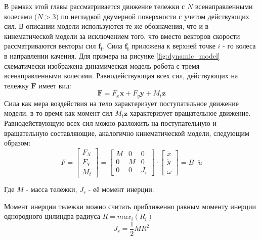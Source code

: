 \documentclass[oneside,final,14pt]{extreport}
\newcommand{\bs}{\boldsymbol}
\begin{document}
В рамках этой главы рассматривается движение тележки с $N$ всенаправленными колесами ($N > 3$) по негладкой двумерной поверхности с учетом действующих сил. В описании модели используются те же обозначения, что и в кинематической модели за исключением того, что вместо векторов скорости рассматриваются векторы сил $\bs{f_{i}}$. Сила $\bs{f_{i}}$ приложена к верхней точке $i$ - го колеса в направлении качения. Для примера на рисунке \ref{fig:dynamic_model} схематически изображена динамическая модель робота с тремя всенаправленными колесами. Равнодействующая всех сил, действующих на тележку $\bs{F}$ имеет вид:
\begin{equation}
\bs{F}
=
F_{x}\bs{x}
+
F_{y}\bs{y}
+
M_{t}\bs{z}
\end{equation} 
Сила как мера воздействия на тело характеризует поступательное движение модели, в то время как момент сил $M_{t}\bs{z}$ характеризует вращательное движение. Равнодействующую всех сил можно разложить на поступательную и вращательную составляющие, аналогично кинематической модели, следующим образом:
\begin{equation}
F
=
\begin{bmatrix}
F_{X} \\
F_{Y} \\
M_{t}
\end{bmatrix}
=
\begin{bmatrix}
M & 0 & 0 \\
0 & M & 0 \\
0 & 0 & J_{r}
\end{bmatrix}
\cdot
\begin{bmatrix}
\ddot{x}\\
\ddot{y} \\
\dot{\omega}
\end{bmatrix}
=
B \cdot \ddot{u}
\end{equation}

Где $M$ - масса тележки, $J_{r}$ - её момент инерции. 

\begin{figure}[H]
\end{figure}
Момент инерции тележки можно считать приближенно равным моменту инерции однородного цилиндра радиуса $R=max_{i}(R_{i})$ 
\begin{equation}
J_{r}
=
\frac{1}{2}
MR^{2}
\end{equation}
\end{document}
